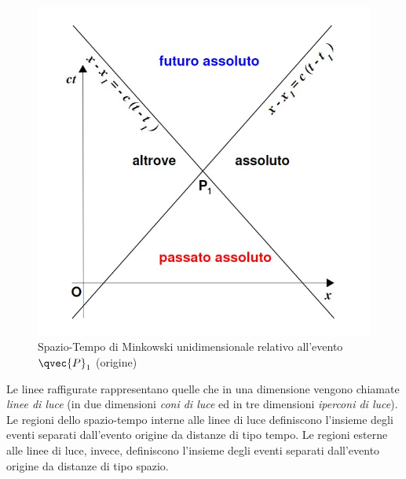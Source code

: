 \begin{figure}[ht]
	\centering
	\includegraphics[scale=0.5]{./img/2020_03_20/minkowski.jpg}
	\caption{Spazio-Tempo di Minkowski unidimensionale relativo all'evento
		$\qvec{P}_1$ (origine)}
	\label{fig:minkowski}
\end{figure}

Le linee raffigurate rappresentano quelle che in una dimensione vengono
chiamate \textit{linee di luce} (in due dimensioni \textit{coni di luce}
ed in tre dimensioni \textit{iperconi di luce}). Le regioni dello spazio-tempo
interne alle linee di luce definiscono l'insieme degli eventi separati
dall'evento origine da distanze	di tipo tempo. Le regioni esterne alle linee di
luce, invece, definiscono l'insieme degli eventi separati dall'evento origine
da distanze di tipo spazio.

